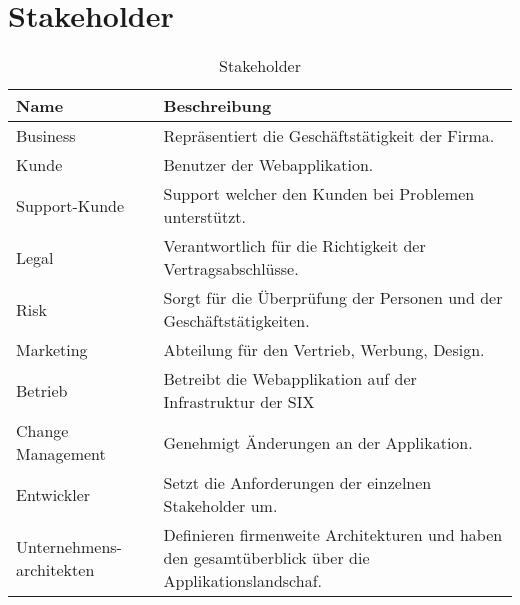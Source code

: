 \section{Stakeholder}

\begin{table}[H]
	\centering
	\caption{Stakeholder}
	\begin{tabular}{ | p{3cm} | p{13cm} | }
		\toprule
		{\textbf{Name}} & {\textbf{Beschreibung}} \\
		\midrule
		Business & Repräsentiert die Geschäftstätigkeit der Firma.\\ \hline
		Kunde & Benutzer der Webapplikation. \\ \hline
		Support-Kunde & Support welcher den Kunden bei Problemen unterstützt. \\ \hline
		Legal &  Verantwortlich für die Richtigkeit der Vertragsabschlüsse. \\ \hline
		Risk & Sorgt für die Überprüfung der Personen und der Geschäftstätigkeiten. \\ \hline
		Marketing & Abteilung für den Vertrieb, Werbung, Design. \\ \hline
		Betrieb & Betreibt die Webapplikation auf der Infrastruktur der SIX \\ \hline
		Change Management & Genehmigt Änderungen an der Applikation. \\ \hline
		Entwickler & Setzt die Anforderungen der einzelnen Stakeholder um. \\  \hline
		Unternehmens-architekten & Definieren firmenweite Architekturen und haben den gesamtüberblick über die Applikationslandschaf.\\ 
		\bottomrule
	\end{tabular}
\end{table}